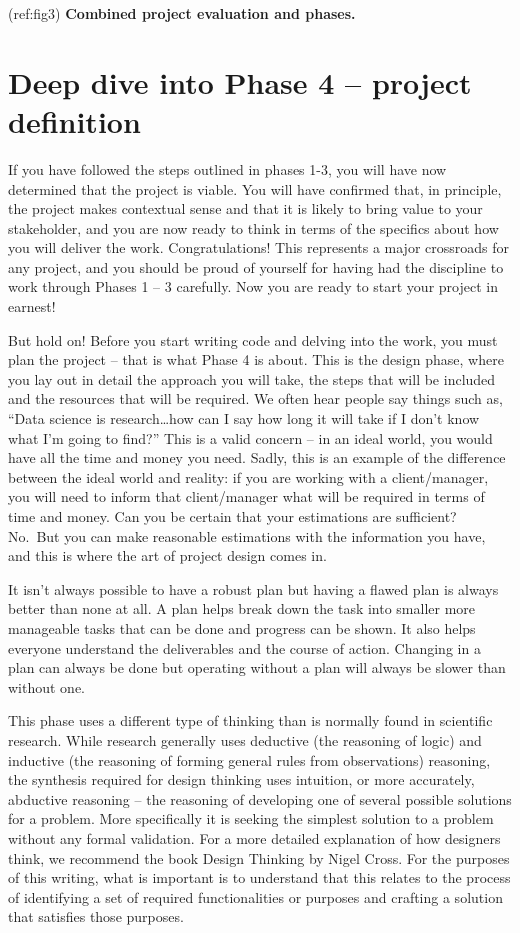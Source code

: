 \documentclass[
]{book}
\begin{document}
(ref:fig3) \textbf{Combined project evaluation and phases.}

\hypertarget{definition}{%
\chapter{Deep dive into Phase 4 -- project
definition}\label{definition}}

If you have followed the steps outlined in phases 1-3, you will have now
determined that the project is viable. You will have confirmed that, in
principle, the project makes contextual sense and that it is likely to
bring value to your stakeholder, and you are now ready to think in terms
of the specifics about how you will deliver the work. Congratulations!
This represents a major crossroads for any project, and you should be
proud of yourself for having had the discipline to work through Phases 1
-- 3 carefully. Now you are ready to start your project in earnest!

But hold on! Before you start writing code and delving into the work,
you must plan the project -- that is what Phase 4 is about. This is the
design phase, where you lay out in detail the approach you will take,
the steps that will be included and the resources that will be required.
We often hear people say things such as, ``Data science is
research\ldots how can I say how long it will take if I don't know what
I'm going to find?'' This is a valid concern -- in an ideal world, you
would have all the time and money you need. Sadly, this is an example of
the difference between the ideal world and reality: if you are working
with a client/manager, you will need to inform that client/manager what
will be required in terms of time and money. Can you be certain that
your estimations are sufficient? No.~But you can make reasonable
estimations with the information you have, and this is where the art of
project design comes in.

It isn't always possible to have a robust plan but having a flawed plan
is always better than none at all. A plan helps break down the task into
smaller more manageable tasks that can be done and progress can be
shown. It also helps everyone understand the deliverables and the course
of action. Changing in a plan can always be done but operating without a
plan will always be slower than without one.

This phase uses a different type of thinking than is normally found in
scientific research. While research generally uses deductive (the
reasoning of logic) and inductive (the reasoning of forming general
rules from observations) reasoning, the synthesis required for design
thinking uses intuition, or more accurately, abductive reasoning -- the
reasoning of developing one of several possible solutions for a problem.
More specifically it is seeking the simplest solution to a problem
without any formal validation. For a more detailed explanation of how
designers think, we recommend the book Design Thinking by Nigel Cross.
For the purposes of this writing, what is important is to understand
that this relates to the process of identifying a set of required
functionalities or purposes and crafting a solution that satisfies those
purposes.
\end{document}
